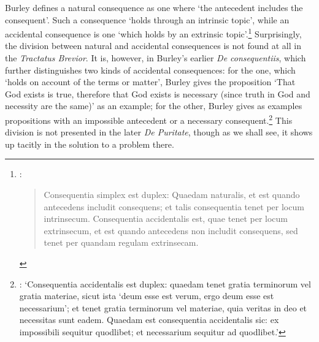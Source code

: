 \documentclass[]{birkjour}
\begin{document}
Burley defines a natural consequence as one where `the antecedent includes the consequent'. Such a consequence `holds through an intrinsic topic', while an accidental consequence is one `which holds by an extrinsic topic'.\footnote{\autocite[p. 61.6-10]{BurleyDPAL}: \begin{quote}
		Consequentia simplex est duplex: Quaedam naturalis, et est quando antecedens includit consequens; et talis consequentia tenet per locum intrinsecum. Consequentia accidentalis est, quae tenet per locum extrinsecum, et est quando antecedens non includit consequens, sed tenet per quandam regulam extrinsecam.
	\end{quote}} Surprisingly, the division between natural and accidental consequences is not found at all in the \textit{Tractatus Brevior}. It is, however, in Burley's earlier \textit{De consequentiis}, which further distinguishes two kinds of accidental consequences: for the one, which `holds on account of the terms or matter', Burley gives the proposition `That God exists is true, therefore that God exists is necessary (since truth in God and necessity are the same)' as an example; for the other, Burley gives as examples propositions with an impossible antecedent or a necessary consequent.\footnote{\autocite[pp. 128-129, par. 70]{Green-Pedersen1980b}: `Consequentia accidentalis est duplex: quaedam tenet gratia terminorum vel gratia materiae, sicut ista `deum esse est verum, ergo deum esse est necessarium'; et tenet gratia terminorum vel materiae, quia veritas in deo et necessitas sunt eadem. Quaedam est consequentia accidentalis sic: ex impossibili sequitur quodlibet; et necessarium sequitur ad quodlibet.'} This division is not presented in the later \textit{De Puritate}, though as we shall see, it shows up tacitly in the solution to a problem there.
\end{document}
